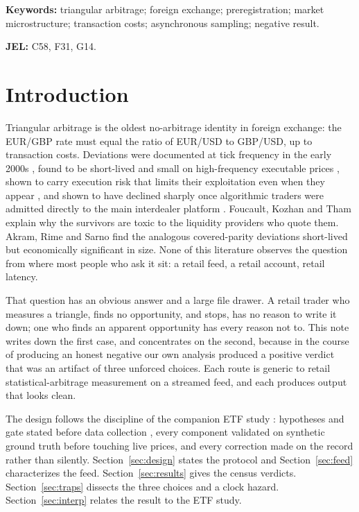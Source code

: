 \documentclass[11pt]{article}
\begin{document}
\medskip
\noindent\textbf{Keywords:} triangular arbitrage; foreign exchange;
preregistration; market microstructure; transaction costs;
asynchronous sampling; negative result.

\smallskip
\noindent\textbf{JEL:} C58, F31, G14.

\section{Introduction}

Triangular arbitrage is the oldest no-arbitrage identity in foreign
exchange: the EUR/GBP rate must equal the ratio of EUR/USD to GBP/USD, up
to transaction costs. Deviations were documented at tick frequency in
the early 2000s \cite{aiba2002}, found to be short-lived and small on
high-frequency executable prices \cite{fenn2009}, shown to carry execution
risk that limits their exploitation even when they appear
\cite{kozhan2012}, and shown to have declined sharply once algorithmic
traders were admitted directly to the main interdealer platform
\cite{chaboud2014,ito2020}. Foucault, Kozhan and Tham \cite{foucault2017}
explain why the survivors are toxic to the liquidity providers who
quote them. Akram, Rime and Sarno \cite{akram2008} find the analogous
covered-parity deviations short-lived but economically significant in
size. None of this literature observes the question from where most
people who ask it sit: a retail feed, a retail account, retail latency.

That question has an obvious answer and a large file drawer. A retail
trader who measures a triangle, finds no opportunity, and stops, has
no reason to write it down; one who finds an apparent opportunity has
every reason not to. This note writes down the first case, and
concentrates on the second, because in the course of producing an
honest negative our own analysis produced a positive verdict that was
an artifact of three unforced choices. Each route is
generic to retail statistical-arbitrage measurement on a streamed feed,
and each produces output that looks clean.

The design follows the discipline of the companion ETF study
\cite{ross2026}: hypotheses and gate stated before data collection
\cite{nosek2018}, every component validated on synthetic ground truth
before touching live prices, and every correction made on the record
rather than silently. Section~\ref{sec:design} states the protocol and
Section~\ref{sec:feed} characterizes the feed. Section~\ref{sec:results}
gives the census verdicts. Section~\ref{sec:traps} dissects the three
choices and a clock hazard. Section~\ref{sec:interp}
relates the result to the ETF study.
\end{document}
